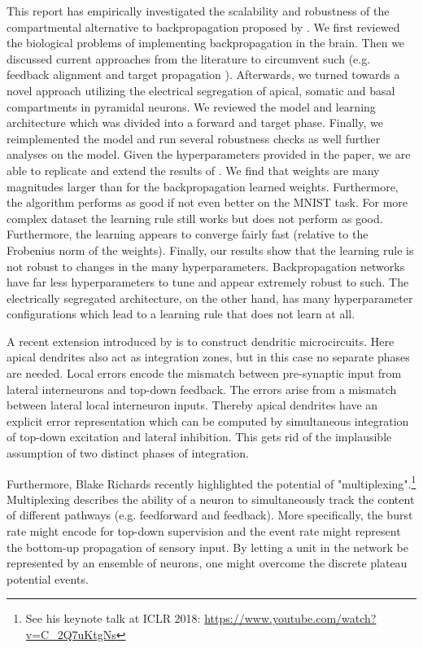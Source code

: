 \documentclass[colorinlistoftodos]{article}
\theoremstyle{definition}
\begin{document}
This report has empirically investigated the scalability and robustness of the compartmental alternative to backpropagation proposed by \citet{guerguiev2017}. We first reviewed the biological problems of implementing backpropagation in the brain. Then we discussed current approaches from the literature to circumvent such (e.g. feedback alignment \citep{lillicrap2016} and target propagation \citep{lee2015}). Afterwards, we turned towards a novel approach utilizing the electrical segregation of apical, somatic and basal compartments in pyramidal neurons. We reviewed the model and learning architecture which was divided into a forward and target phase. 
Finally, we reimplemented the model and run several robustness checks as well further analyses on the model. Given the hyperparameters provided in the paper, we are able to replicate and extend the results of \citet{guerguiev2017}. We find that weights are many magnitudes larger than for the backpropagation learned weights. Furthermore, the algorithm performs as good if not even better on the MNIST task. 
For more complex dataset the learning rule still works but does not perform as good. Furthermore, the learning appears to converge fairly fast (relative to the Frobenius norm of the weights).
Finally, our results show that the learning rule is not robust to changes in the many hyperparameters. Backpropagation networks have far less hyperparameters to tune and appear extremely robust to such. The electrically segregated architecture, on the other hand, has many hyperparameter configurations which lead to a learning rule that does not learn at all.

A recent extension introduced by \citet{sacramento2018} is to construct dendritic microcircuits. Here apical dendrites also act as integration zones, but in this case no separate phases are needed. Local errors encode the mismatch between pre-synaptic input from lateral interneurons and top-down feedback. The errors arise from a mismatch between lateral local interneuron inputs. Thereby apical dendrites have an explicit error representation which can be computed by simultaneous integration of top-down excitation and lateral inhibition. This gets rid of the implausible assumption of two distinct phases of integration.

Furthermore, Blake Richards recently highlighted the potential of "multiplexing".\footnote{See his keynote talk at ICLR 2018: \url{https://www.youtube.com/watch?v=C_2Q7uKtgNs}} Multiplexing \citep{naud_2018} describes the ability of a neuron to simultaneously track the content of different pathways (e.g. feedforward and feedback). More specifically, the burst rate might encode for top-down supervision and the event rate might represent the bottom-up propagation of sensory input. By letting a unit in the network be represented by an ensemble of neurons, one might overcome the discrete plateau potential events.
\end{document}
